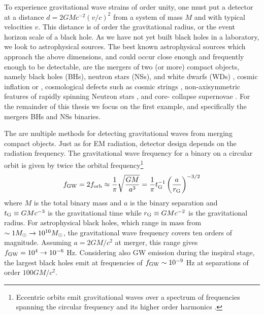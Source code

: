 To experience gravitational wave strains of order unity, one must put a
detector at a distance $d= 2GMc^{-2} (v/c)^2$ from a system of mass $M$ and
with typical velocities $v$. This distance is of order the gravitational
radius, or the event horizon scale of a black hole. As we have not yet built
black holes in a laboratory, we look to astrophysical sources. The best known
astrophysical sources which approach the above dimensions, and could occur
close enough and frequently enough to be detectable, are the mergers of two
(or more) compact objects, namely black holes (BHs), neutron stars (NSs), and
white dwarfs (WDs) \citep[\emph{e.g.}][]{ThorneBraginsky:1976,
ClarkeErdley:1977, Belczynski:2016}, cosmic inflation \citep{Starobinski:1979}
or \citep[\emph{e.g.}][for a recent review]{Guzzetti:2016}, cosmological
defects such as cosmic strings \citep[\emph{e.g.}][and references therein]{Damour:2005}, 
non-axisymmetric features of rapidly spinning Neutron
stars \citep[\emph{e.g.}][and refernces therein]{Haskell:2015}, and core-
collapse supernovae \citep[\emph{e.g.}][and references therein]{FryerNew:2003:LRR}. 
For the remainder of this thesis we focus on the first example, and specifically 
the mergers BHs and NSs binaries.

The are multiple methods for detecting gravitational waves from merging
compact objects. Just as for EM radiation, detector design depends on the
radiation frequency. The gravitational wave frequency for a binary on a
circular orbit is given by twice the orbital frequency\footnote{Eccentric
orbits emit gravitational waves over a spectrum of frequencies spanning the
circular frequency and its higher order harmonics \citep[\emph{e.g.}][]{Enoki:2007}.} 
\begin{equation}
f_{\rm{GW}} = 2 f_{\rm{orb}} \approx  \frac{1}{\pi} \sqrt{\frac{G M }{a^3}} =
\frac{1}{\pi} t^{-1}_{\rm{G}} \left( \frac{a}{r_{\rm{G}}} \right)^{-3/2}
\end{equation} 
where $M$ is the total binary mass and $a$ is the binary
separation and $t_{\rm{G}} \equiv GMc^{-3}$ is the gravitational time while
$r_{\rm{G}} \equiv GMc^{-2}$ is the gravitational radius.  For astrophysical
black holes, which range in mass from $\sim 1 {M_{\odot}} \rightarrow 10^{10}
{M_{\odot}}$, the gravitational wave frequency covers ten orders of magnitude.
Assuming $a = 2GM/c^2$ at merger, this range gives $f_{\rm{GW}} = 10^4 \rightarrow
10^{-6}$ Hz. Considering also GW emission during the inspiral stage, the
largest black holes emit at frequencies of $f_{\rm{GW}} \sim 10^{-9}$ Hz at
separations of order $100 GM/c^2$.

